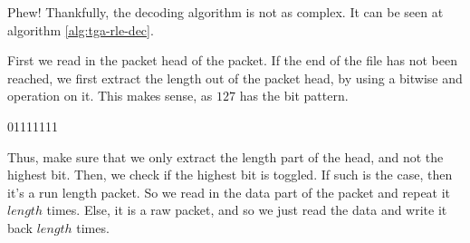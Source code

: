 \begin{refsection}
\begin{algorithm}[h]
\begin{algorithmic}[1]
            \State {}
          \EndIf


        \Else


            \State {}

          \Else


          \EndIf

        \EndIf
      \EndIf


    \EndWhile

        \State {}
      \Else
        \State {}
      \EndIf
    \EndIf
  \end{algorithmic}
\end{algorithm}

Phew! Thankfully, the decoding algorithm is not as complex. It can be
seen at algorithm \ref{alg:tga-rle-dec}.

First we read in the packet head of the packet. If the end of the file
has not been reached, we first extract the length out of the packet
head, by using a bitwise and operation on it. This makes sense, as
$127$ has the bit pattern.

\begin{indentpar}
  01111111
\end{indentpar}

Thus, make sure that we only extract the length part of the head, and
not the highest bit. Then, we check if the highest bit is toggled. If
such is the case, then it's a run length packet. So we read in the
data part of the packet and repeat it $length$ times. Else, it is a
raw packet, and so we just read the data and write it back $length$
times.


\end{refsection}
